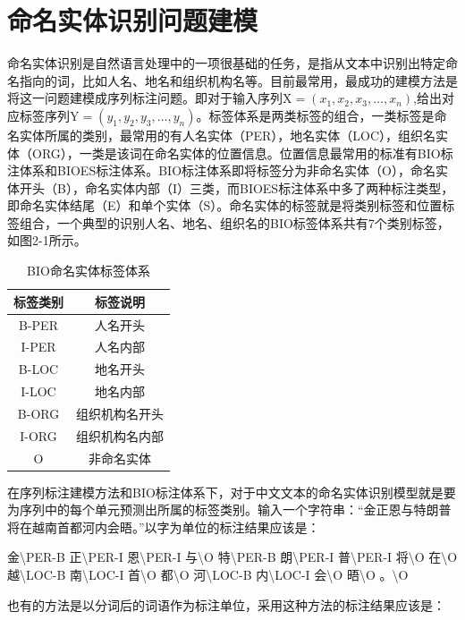 \documentclass[winfonts,master,oneside,nobackinfo]{njuthesis}
\begin{document}
\section{命名实体识别问题建模}
命名实体识别是自然语言处理中的一项很基础的任务，是指从文本中识别出特定命名指向的词，比如人名、地名和组织机构名等。目前最常用，最成功的建模方法是将这一问题建模成序列标注问题。即对于输入序列$\mathrm { X } = \left( x _ { 1 } , x _ { 2 } , x _ { 3 } , \dots , x _ { n } \right)$,给出对应标签序列$\mathrm { Y } = \left( y _ { 1 } , y _ { 2 } , y _ { 3 } , \dots , y _ { n } \right)$。标签体系是两类标签的组合，一类标签是命名实体所属的类别，最常用的有人名实体（PER），地名实体（LOC），组织名实体（ORG），一类是该词在命名实体的位置信息。位置信息最常用的标准有BIO标注体系和BIOES标注体系。BIO标注体系即将标签分为非命名实体（O），命名实体开头（B），命名实体内部（I）三类，而BIOES标注体系中多了两种标注类型，即命名实体结尾（E）和单个实体（S）。命名实体的标签就是将类别标签和位置标签组合，一个典型的识别人名、地名、组织名的BIO标签体系共有7个类别标签，如图2-1所示。

\begin{table}[ht]
\centering
\begin{tabular}{cc} %
\hline 
标签类别&标签说明\\
\hline  
B-PER&人名开头\\
I-PER&人名内部\\
B-LOC&地名开头\\
I-LOC&地名内部\\
B-ORG&组织机构名开头\\
I-ORG&组织机构名内部\\
O&非命名实体\\
\hline 
\end{tabular}
\caption{BIO命名实体标签体系}
\end{table}

在序列标注建模方法和BIO标注体系下，对于中文文本的命名实体识别模型就是要为序列中的每个单元预测出所属的标签类别。输入一个字符串：“金正恩与特朗普将在越南首都河内会晤。”以字为单位的标注结果应该是：

金\textbackslash PER-B 正\textbackslash PER-I 恩\textbackslash PER-I 与\textbackslash O 特\textbackslash PER-B 朗\textbackslash PER-I 普\textbackslash PER-I 将\textbackslash O 在\textbackslash O 越\textbackslash LOC-B 南\textbackslash LOC-I 首\textbackslash O 都\textbackslash O 河\textbackslash LOC-B 内\textbackslash LOC-I 会\textbackslash O 晤\textbackslash O 。\textbackslash O

也有的方法是以分词后的词语作为标注单位，采用这种方法的标注结果应该是：
\end{document}
